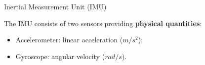 \documentclass{beamer}
\begin{document}



\begin{frame}{Inertial Measurement Unit (IMU)}

The IMU consists of two sensors providing \textbf{physical quantities}:
\begin{itemize}
\item Accelerometer: linear acceleration ($m/s^2$);
\item Gyroscope: angular velocity ($rad/s$).
\end{itemize}

\end{frame}
\end{document}

